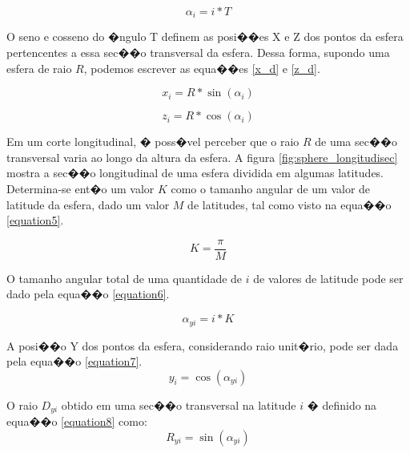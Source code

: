 \documentclass[12pt]{article}
\begin{document}
\begin{equation}
\alpha_{i} = i * T
\label{longitudealpha}
\end{equation}

O seno e cosseno do �ngulo T definem as posi��es X e Z dos pontos da esfera pertencentes a essa sec��o transversal da esfera. Dessa forma, supondo uma esfera de raio $R$, podemos escrever as equa��es \ref{x_d} e \ref{z_d}.

\begin{equation}
x_{i} = R * \sin(\alpha_{i})
\label{x_d}
\end{equation}

\begin{equation}
z_{i} = R * \cos(\alpha_{i})
\label{z_d}
\end{equation}

Em um corte longitudinal, � poss�vel perceber que o raio $R$ de uma sec��o transversal varia ao longo da altura da esfera. A figura \ref{fig:sphere_longitudisec} mostra a sec��o longitudinal de uma esfera dividida em algumas latitudes. Determina-se ent�o um valor $K$ como o tamanho angular de um valor de latitude da esfera, dado um valor $M$ de latitudes, tal como visto na equa��o \ref{equation5}.


\begin{equation}
K = \frac{\pi}{M}
\label{equation5}
\end{equation}

O tamanho angular total de uma quantidade de $i$ de valores de latitude pode ser dado pela equa��o \ref{equation6}.

\begin{equation}
\alpha_{yi} = i * K
\label{equation6}
\end{equation}

A posi��o Y dos pontos da esfera, considerando raio unit�rio, pode ser dada pela equa��o \ref{equation7}.
\begin{equation}
y_{i} = \cos(\alpha_{yi})
\label{equation7}
\end{equation}

O raio $D_{yi}$ obtido em uma sec��o transversal na latitude $i$ � definido na equa��o \ref{equation8} como:
\begin{equation}
R_{yi} = \sin(\alpha_{yi})
\label{equation8}
\end{equation}
\end{document}
